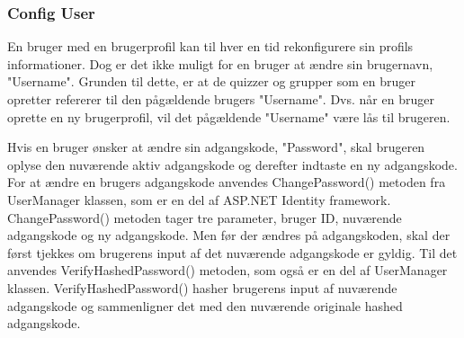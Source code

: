 \subsubsection{Config User}

En bruger med en brugerprofil kan til hver en tid rekonfigurere sin profils informationer. Dog er det ikke muligt for en bruger at ændre sin brugernavn, "Username". Grunden til dette, er at de quizzer og grupper som en bruger opretter refererer til den pågældende brugers "Username". Dvs. når en bruger oprette en ny brugerprofil, vil det pågældende "Username" være lås til brugeren. 

Hvis en bruger ønsker at ændre sin adgangskode, "Password", skal brugeren oplyse den nuværende aktiv adgangskode og derefter indtaste en ny adgangskode. For at ændre en brugers adgangskode anvendes ChangePassword() metoden fra UserManager klassen, som er en del af ASP.NET Identity framework. ChangePassword() metoden tager tre parameter, bruger ID, nuværende adgangskode og ny adgangskode. Men før der ændres på adgangskoden, skal der først tjekkes om brugerens input af det nuværende adgangskode er gyldig. Til det anvendes VerifyHashedPassword() metoden, som også er en del af UserManager klassen. VerifyHashedPassword() hasher brugerens input af nuværende adgangskode og sammenligner det med den nuværende originale hashed adgangskode. 